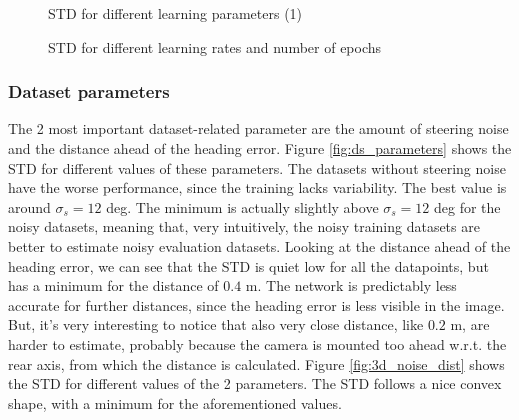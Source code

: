 \documentclass[a4paper,12pt,sort&compress]{article}
\begin{document}
    \begin{figure}
        \centering
        \begin{subfigure}[b]{\textwidth}
            \centering
        \end{subfigure}
        \begin{subfigure}[b]{\textwidth}
            \centering
        \end{subfigure}
        \caption{STD for different learning parameters (1)}
        \label{fig:learning_params1}
    \end{figure}


    \begin{figure}
        \centering
        \caption{STD for different learning rates and number of epochs}
        \label{fig:3d_lr_epochs}
    \end{figure}

\clearpage

\subsubsection*{Dataset parameters}
    The 2 most important dataset-related parameter are the amount of steering noise and the distance
    ahead of the heading error. Figure \ref{fig:ds_parameters} shows the STD for different values of
    these parameters. The datasets without steering noise have the worse performance, since the
    training lacks variability. The best value is around $\sigma_s = 12$ deg. The minimum is
    actually slightly above $\sigma_s = 12$ deg for the noisy datasets, meaning that, very
    intuitively, the noisy training datasets are better to estimate noisy evaluation datasets. 
    Looking at the distance ahead of the heading error, we can see that the STD is quiet low for all
    the datapoints, but has a minimum for the distance of $\num{0.4}$ m. The network is predictably
    less accurate for further distances, since the heading error is less visible in the image. But,
    it's very interesting to notice that also very close distance, like $\num{0.2}$ m, are harder to
    estimate, probably because the camera is mounted too ahead w.r.t. the rear axis, from which the
    distance is calculated. Figure \ref{fig:3d_noise_dist} shows the STD for different values of the
    2 parameters. The STD follows a nice convex shape, with a minimum for the aforementioned values. 
\end{document}
